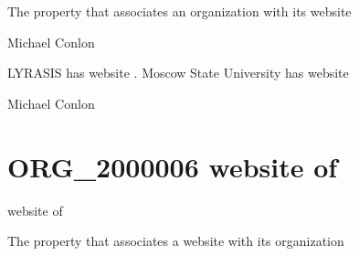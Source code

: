 \documentclass[letterpaper,10pt,english]{sphinxmanual}
\begin{document}
\begin{sphinxShadowBox}

\sphinxAtStartPar
The property that associates an organization with its website
\end{sphinxShadowBox}

\begin{sphinxShadowBox}

\sphinxAtStartPar
Michael Conlon 
\end{sphinxShadowBox}

\begin{sphinxShadowBox}

\sphinxAtStartPar
LYRASIS has website .  Moscow State University has website 
\end{sphinxShadowBox}

\begin{sphinxShadowBox}

\sphinxAtStartPar
Michael Conlon 
\end{sphinxShadowBox}
\begin{quote}
\label{\detokenize{doc-ORG_2000006:org-2000006}}\label{\detokenize{doc-ORG_2000006:website-of}}\label{\detokenize{doc-ORG_2000006:org-2000006}}
\ignorespaces \end{quote}


\section{ORG\_2000006 \sphinxhyphen{} website of}
\label{\detokenize{doc-ORG_2000006:org-2000006-website-of}}\label{\detokenize{doc-ORG_2000006:index-0}}\label{\detokenize{doc-ORG_2000006::doc}}
\begin{sphinxShadowBox}

\sphinxAtStartPar
website of
\end{sphinxShadowBox}

\begin{sphinxShadowBox}

\sphinxAtStartPar
The property that associates a website with its organization
\end{sphinxShadowBox}
\end{document}
